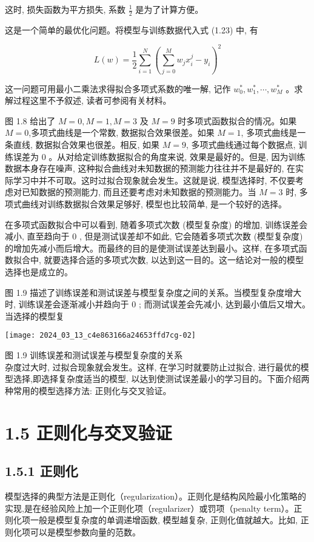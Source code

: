\documentclass[10pt]{article}
\begin{document}
这时, 损失函数为平方损失, 系数 $\frac{1}{2}$ 是为了计算方便。

这是一个简单的最优化问题。将模型与训练数据代入式 (1.23) 中, 有

$$
L(w)=\frac{1}{2} \sum_{i=1}^{N}\left(\sum_{j=0}^{M} w_{j} x_{i}^{j}-y_{i}\right)^{2}
$$

这一问题可用最小二乘法求得拟合多项式系数的唯一解, 记作 $w_{0}^{*}, w_{1}^{*}, \cdots, w_{M}^{*}$ 。求解过程这里不予叙述, 读者可参阅有关材料。

图 1.8 给出了 $M=0, M=1, M=3$ 及 $M=9$ 时多项式函数拟合的情况。如果 $M=0$,多项式曲线是一个常数, 数据拟合效果很差。如果 $M=1$, 多项式曲线是一条直线, 数据拟合效果也很差。相反, 如果 $M=9$, 多项式曲线通过每个数据点, 训练误差为 0 。从对给定训练数据拟合的角度来说, 效果是最好的。但是, 因为训练数据本身存在噪声, 这种拟合曲线对未知数据的预测能力往往并不是最好的, 在实际学习中并不可取。这时过拟合现象就会发生。这就是说, 模型选择时, 不仅要考虑对已知数据的预测能力, 而且还要考虑对未知数据的预测能力。当 $M=3$ 时, 多项式曲线对训练数据拟合效果足够好, 模型也比较简单, 是一个较好的选择。

在多项式函数拟合中可以看到, 随着多项式次数 (模型复杂度) 的增加, 训练误差会减小, 直至趋向于 0 , 但是测试误差却不如此, 它会随着多项式次数 (模型复杂度) 的增加先减小而后增大。而最终的目的是使测试误差达到最小。这样, 在多项式函数拟合中, 就要选择合适的多项式次数, 以达到这一目的。这一结论对一般的模型选择也是成立的。

图 1.9 描述了训练误差和测试误差与模型复杂度之间的关系。当模型复杂度增大时, 训练误差会逐渐减小并趋向于 0 ; 而测试误差会先减小, 达到最小值后又增大。当选择的模型复

\begin{center}
\texttt{[image: 2024\_03\_13\_c4e863166a24653ffd7cg-02]}
\end{center}

图 1.9 训练误差和测试误差与模型复杂度的关系\\
杂度过大时, 过拟合现象就会发生。这样, 在学习时就要防止过拟合, 进行最优的模型选择,即选择复杂度适当的模型, 以达到使测试误差最小的学习目的。下面介绍两种常用的模型选择方法: 正则化与交叉验证。

\section*{1.5 正则化与交叉验证}
\subsection*{1.5.1 正则化}
模型选择的典型方法是正则化（regularization）。正则化是结构风险最小化策略的实现,是在经验风险上加一个正则化项（regularizer）或罚项（penalty term）。正则化项一般是模型复杂度的单调递增函数, 模型越复杂, 正则化值就越大。比如, 正则化项可以是模型参数向量的范数。
\end{document}

